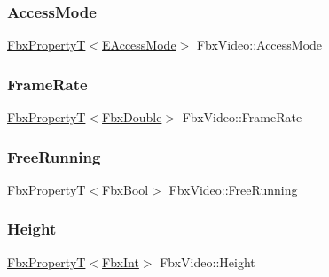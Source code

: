 \subsubsection{\texorpdfstring{Access\+Mode}{AccessMode}}
{\footnotesize\ttfamily \hyperlink{class_fbx_property_t}{Fbx\+PropertyT}$<$\hyperlink{class_fbx_video_a6dd88dabb2170adcd8c58952ed2e0c40}{E\+Access\+Mode}$>$ Fbx\+Video\+::\+Access\+Mode}

\mbox{\label{class_fbx_video_ac97913b5255c4f67ec2d401d8ff2b619}} 
\subsubsection{\texorpdfstring{Frame\+Rate}{FrameRate}}
{\footnotesize\ttfamily \hyperlink{class_fbx_property_t}{Fbx\+PropertyT}$<$\hyperlink{fbxtypes_8h_a171e72a1c46fc15c1a6c9c31948c1c5b}{Fbx\+Double}$>$ Fbx\+Video\+::\+Frame\+Rate}

\mbox{\label{class_fbx_video_abb47ae8cd752b8846cda1ad1d7e1ffff}} 
\subsubsection{\texorpdfstring{Free\+Running}{FreeRunning}}
{\footnotesize\ttfamily \hyperlink{class_fbx_property_t}{Fbx\+PropertyT}$<$\hyperlink{fbxtypes_8h_a92e0562b2fe33e76a242f498b362262e}{Fbx\+Bool}$>$ Fbx\+Video\+::\+Free\+Running}

\mbox{\label{class_fbx_video_a9e77b423cac730992fe57429c302593c}} 
\subsubsection{\texorpdfstring{Height}{Height}}
{\footnotesize\ttfamily \hyperlink{class_fbx_property_t}{Fbx\+PropertyT}$<$\hyperlink{fbxtypes_8h_a088fa96de3b0b3ea69f0f6afef525dfb}{Fbx\+Int}$>$ Fbx\+Video\+::\+Height}

\mbox{\label{class_fbx_video_a8d98e668bd42f8ed67e8bc28488d0abb}} 

